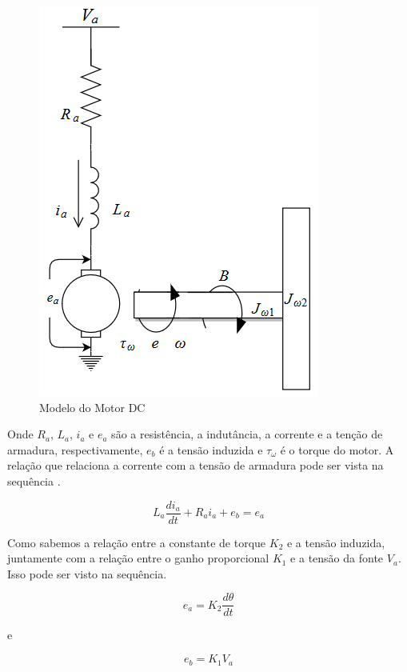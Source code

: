 \begin{figure}[H]
  \caption{Modelo do Motor DC}
  \begin{center}
      \includegraphics[scale=.7]{img/modelo_motor_dc}
  \end{center}
  \label{fig:modelo_motor_dc}
\end{figure}

Onde $R_a$, $L_a$, $i_a$ e $e_a$ são a resistência, a indutância, a corrente e a tenção de armadura, respectivamente, $e_b$ é a tensão induzida e $\tau_{\omega}$ é o torque do motor. A relação que relaciona a corrente com a tensão de armadura pode ser vista na sequência \cite{Ogata}.

\begin{equation}
L_a \frac{di_a}{dt}+R_a i_a + e_b = e_a
\end{equation}

Como sabemos a relação entre a constante de torque $K_2$ e a tensão induzida, juntamente com a relação entre o ganho proporcional $K_1$ e a tensão da fonte $V_a$. Isso pode ser visto na sequência.

\begin{equation}
  e_a = K_2\frac{d\theta}{dt}
\end{equation}

e

\begin{equation}
  e_b = K_1V_a
\end{equation}

